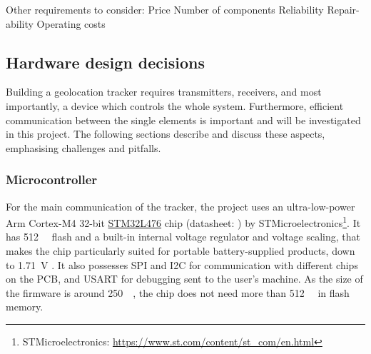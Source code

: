 Other requirements to consider:
Price
Number of components
Reliability
Repair-ability
Operating costs

\subsection{Hardware design decisions}
Building a geolocation tracker requires transmitters, receivers, and most importantly, a device which controls the whole system. Furthermore, efficient communication between the single elements is important and will be investigated in this project. The following sections describe and discuss these aspects, emphasising challenges and pitfalls.

\subsubsection{Microcontroller}
For the main communication of the tracker, the project uses an ultra-low-power Arm\textsuperscript{\textregistered} Cortex\textsuperscript{\textregistered}-M4 32-bit \hyperref[bom:stm32l476]{STM32L476} chip (datasheet: ) by STMicroelectronics\footnote{STMicroelectronics: \url{https://www.st.com/content/st_com/en.html}}. It has \SI{512}{\kilo\byte} flash and a built-in internal voltage regulator and voltage scaling, that makes the chip particularly suited for portable battery-supplied products, down to \SI{1.71}{\volt} \cite{STM32L4_application_note}. It also possesses \ac{SPI} and \ac{I2C} for communication with different chips on the \ac{PCB}, and \ac{USART} for debugging sent to the user's machine. As the size of the firmware is around \SI{250}{\kilo\byte}, the chip does not need more than \SI{512}{\kilo\byte} in flash memory.

